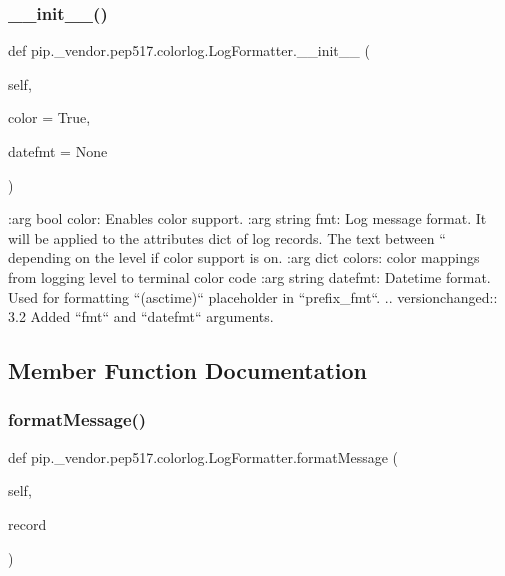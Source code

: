 \subsubsection{\texorpdfstring{\+\_\+\+\_\+init\+\_\+\+\_\+()}{\_\_init\_\_()}}
{\footnotesize\ttfamily def pip.\+\_\+vendor.\+pep517.\+colorlog.\+Log\+Formatter.\+\_\+\+\_\+init\+\_\+\+\_\+ (\begin{DoxyParamCaption}\item[{}]{self,  }\item[{}]{color = {\ttfamily True},  }\item[{}]{datefmt = {\ttfamily None} }\end{DoxyParamCaption})}

\begin{DoxyVerb}:arg bool color: Enables color support.
:arg string fmt: Log message format.
It will be applied to the attributes dict of log records. The
text between ``%
depending on the level if color support is on.
:arg dict colors: color mappings from logging level to terminal color
code
:arg string datefmt: Datetime format.
Used for formatting ``(asctime)`` placeholder in ``prefix_fmt``.
.. versionchanged:: 3.2
Added ``fmt`` and ``datefmt`` arguments.
\end{DoxyVerb}
 

\subsection{Member Function Documentation}
\mbox{\label{classpip_1_1__vendor_1_1pep517_1_1colorlog_1_1LogFormatter_a42e68b82c8501cd4a7faea7637cfbdca}} 
\subsubsection{\texorpdfstring{format\+Message()}{formatMessage()}}
{\footnotesize\ttfamily def pip.\+\_\+vendor.\+pep517.\+colorlog.\+Log\+Formatter.\+format\+Message (\begin{DoxyParamCaption}\item[{}]{self,  }\item[{}]{record }\end{DoxyParamCaption})}



